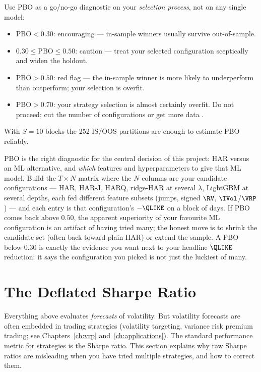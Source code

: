 \begin{keyidea}
Use PBO as a go/no-go diagnostic on your \emph{selection process}, not on any single model:
\begin{itemize}[nosep]
  \item $\text{PBO} < 0.30$: encouraging --- in-sample winners usually survive out-of-sample.
  \item $0.30 \le \text{PBO} \le 0.50$: caution --- treat your selected configuration sceptically and widen the holdout.
  \item $\text{PBO} > 0.50$: red flag --- the in-sample winner is more likely to underperform than outperform; your selection is overfit.
  \item $\text{PBO} > 0.70$: your strategy selection is almost certainly overfit. Do not proceed; cut the number of configurations or get more data \citep{Bailey2014PBO}.
\end{itemize}
With $S = 10$ blocks the 252 IS/OOS partitions are enough to estimate PBO reliably.
\end{keyidea}

\begin{projectconnection}
PBO is the right diagnostic for the central decision of this project: HAR versus an ML alternative, and \emph{which} features and hyperparameters to give that ML model.
Build the $T \times N$ matrix where the $N$ columns are your candidate configurations --- HAR, HAR-J, HARQ, ridge-HAR at several $\lambda$, LightGBM at several depths, each fed different feature subsets (jumps, signed $\RV$, $\IVol$/$\VRP$) --- and each entry is that configuration's $-\QLIKE$ on a block of days.
If PBO comes back above $0.50$, the apparent superiority of your favourite ML configuration is an artifact of having tried many; the honest move is to shrink the candidate set (often back toward plain HAR) or extend the sample.
A PBO below $0.30$ is exactly the evidence you want next to your headline $\QLIKE$ reduction: it says the configuration you picked is not just the luckiest of many.
\end{projectconnection}

\section{The Deflated Sharpe Ratio}
\label{sec:eval-dsr}

Everything above evaluates \emph{forecasts} of volatility.
But volatility forecasts are often embedded in trading strategies (volatility targeting, variance risk premium trading; see Chapters~\ref{ch:vrp} and~\ref{ch:applications}).
The standard performance metric for strategies is the Sharpe ratio.
This section explains why raw Sharpe ratios are misleading when you have tried multiple strategies, and how to correct them.

